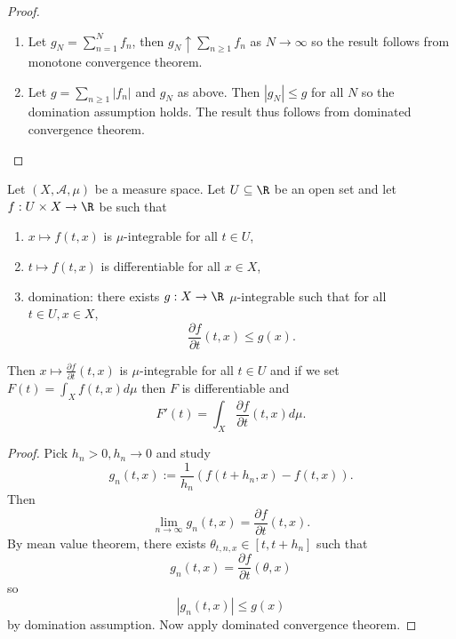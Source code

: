 \documentclass[a4paper]{article}
\begin{document}
\begin{proof}\leavevmode
  \begin{enumerate}
  \item Let \(g_N = \sum_{n = 1}^N f_n\), then \(g_N \uparrow \sum_{n \geq 1} f_n\) as \(N \to \infty\) so the result follows from monotone convergence theorem.
  \item Let \(g = \sum_{n \geq 1} |f_n|\) and \(g_N\) as above. Then \(|g_N| \leq g\) for all \(N\) so the domination assumption holds. The result thus follows from dominated convergence theorem.
  \end{enumerate}
\end{proof}

\begin{corollary}
  Let \((X, \mathcal A, \mu)\) be a measure space. Let \(U \subseteq \R\) be an open set and let \(f: U \times X \to \R\) be such that
  \begin{enumerate}
  \item \(x \mapsto f(t, x)\) is \(\mu\)-integrable for all \(t \in U\),
  \item \(t \mapsto f(t, x)\) is differentiable for all \(x \in X\),
  \item domination: there exists \(g: X \to \R\) \(\mu\)-integrable such that for all \(t \in U, x \in X\),
    \[
      \frac{\partial f}{\partial t} (t, x) \leq g(x).
    \]
  \end{enumerate}
  Then \(x \mapsto \frac{\partial f}{\partial t}(t, x)\) is \(\mu\)-integrable for all \(t \in U\) and if we set \(F(t) = \int_X f(t, x) d\mu\) then \(F\) is differentiable and 
  \[
    F'(t) = \int_X \frac{\partial f}{\partial t}(t, x) d\mu.
  \]
\end{corollary}

\begin{proof}
  Pick \(h_n > 0, h_n \to 0\) and study
  \[
    g_n(t, x) := \frac{1}{h_n} (f(t + h_n, x) - f(t, x)).
  \]
  Then
  \[
    \lim_{n \to \infty} g_n(t, x) = \frac{\partial f}{\partial t}(t, x).
  \]
  By mean value theorem, there exists \(\theta_{t, n, x} \in [t, t + h_n]\) such that
  \[
    g_n(t, x) = \frac{\partial f}{\partial t}(\theta, x)
  \]
  so
  \[
    |g_n(t, x)| \leq g(x)
  \]
  by domination assumption. Now apply dominated convergence theorem.
\end{proof}
\end{document}
